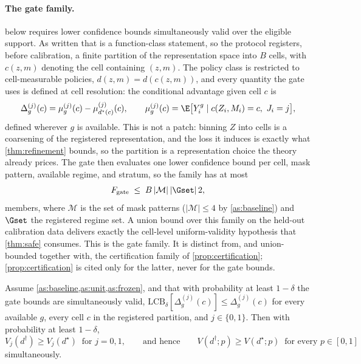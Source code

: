 \paragraph{The gate family.}
 below requires lower confidence bounds simultaneously valid over
the eligible support.  As written that is a function-class statement, so the
protocol registers, before calibration, a finite partition of the representation
space into $B$ cells, with $c(z,m)$ denoting the cell containing $(z,m)$.  The
policy class is restricted to cell-measurable policies, $d(z,m)=d(c(z,m))$, and
every quantity the gate uses is defined at cell resolution: the conditional
advantage given cell $c$ is
\begin{equation}
 \Delta^{(j)}_g(c)=\mu^{(j)}_g(c)-\mu^{(j)}_{d^\star(c)}(c),
 \qquad
 \mu^{(j)}_g(c)=\E\big[Y^g_i\mid c(Z_i,M_i)=c,\ J_i=j\big],
 \label{eq:cell-advantage}
\end{equation}
defined wherever $g$ is available.  This is not a patch: binning $Z$ into cells
is a coarsening of the registered representation, and the loss it induces is
exactly what \cref{thm:refinement} bounds, so the partition is a representation
choice the theory already prices.  The gate then evaluates one lower confidence
bound per cell, mask pattern, available regime, and stratum, so the family has at
most
\begin{equation}
 F_{\mathrm{gate}}\;\le\;B\,|\mathcal M|\,|\Gset|\,2 ,
 \label{eq:gate-family}
\end{equation}
members, where $\mathcal M$ is the set of mask patterns ($|\mathcal M|\le4$ by
\cref{as:baseline}) and $\Gset$ the registered regime set.  A union bound over
this family on the held-out calibration data delivers exactly the cell-level
uniform-validity hypothesis that \cref{thm:safe} consumes.  This is the gate
family.  It is distinct from, and union-bounded together with, the
certification family of \cref{prop:certification}; \cref{prop:certification} is
cited only for the latter, never for the gate bounds.

\begin{theorem}
\label{thm:safe}
Assume \cref{as:baseline,as:unit,as:frozen}, and that with probability at least
$1-\delta$ the gate bounds are
simultaneously valid, $\mathrm{LCB}_\delta[\Delta^{(j)}_g(c)]\le
\Delta^{(j)}_g(c)$ for every available $g$, every cell $c$ in the registered
partition, and $j\in\{0,1\}$.  Then with probability at least $1-\delta$,
\begin{equation}
 V_j(d^\dagger)\ge V_j(d^\star)\ \text{ for }j=0,1,
 \qquad\text{and hence}\qquad
 V(d^\dagger;p)\ge V(d^\star;p)\ \text{ for every }p\in[0,1]
 \label{eq:safe-improvement}
\end{equation}
simultaneously.
\end{theorem}

